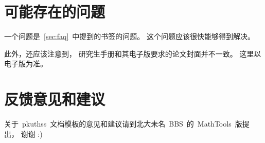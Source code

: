 	\section{可能存在的问题}

	一个问题是~\ref{sec:faq}~中提到的书签的问题。
	这个问题应该很快能够得到解决。

	此外，还应该注意到，
	研究生手册\supercite{F13}和其电子版要求的论文封面并不一致。
	这里以电子版为准。

	\section{反馈意见和建议}

	关于~pkuthss~文档模板的意见和建议请到北大未名~BBS~的~MathTools~版提出，
	谢谢 :)


